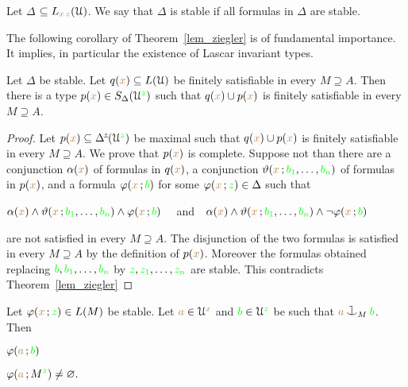 \def\ceq#1#2#3{\parbox[t]{20ex}{$\displaystyle #1$}\medrel{#2}$\displaystyle  #3$}


Let \emph{$\Delta$\/} $\subseteq L_{{\color{brown} x}\,{\color{green} z}}(\EuScript U)$.
We say that $\Delta$ is stable if all formulas in $\Delta$ are stable.

The following corollary of Theorem~\ref{lem_ziegler} is of fundamental importance.
It implies, in particular the existence of Lascar invariant types.

\begin{corollary}\label{corol_stable_coheir_over_models}
  Let  $\Delta$ be stable.
  Let $q({\color{brown} x})\subseteq L(\EuScript U)$ be finitely satisfiable in every $M\supseteq A$.
  Then there is a type $p({\color{brown} x})\in S_\Delta(\EuScript U^{\color{green} z})$ such that $q({\color{brown} x})\cup p({\color{brown} x})$ is finitely satisfiable in every $M\supseteq A$.
\end{corollary}

\begin{proof}
  Let $p({\mr x})\subseteq \pmDelta(\U^{\gr z})$ be maximal such that $q({\color{brown} x})\cup p({\color{brown} x})$ is finitely satisfiable in every $M\supseteq A$.
  We prove that $p({\color{brown} x})$ is complete.
  Suppose not than there are a conjunction $\alpha({\color{brown} x})$ of formulas in $q({\color{brown} x})$, a conjunction $\vartheta({\color{brown} x}\,;{\color{green} b_1},\dots,{\color{green} b_n})$ of formulas in $p({\color{brown} x})$, and a formula $\varphi({\color{brown} x}\,;{\color{green} b})$ for some $\varphi({\color{brown} x}\,;{\color{green} z})\in\Delta$ such that 

  \hfil$\alpha({\color{brown} x})\wedge\vartheta({\color{brown} x}\,;{\color{green} b_1},\dots,{\color{green} b_n})\wedge\varphi({\color{brown} x}\,;{\color{green} b})$ \ \ and\ \   $\alpha({\color{brown} x})\wedge\vartheta({\color{brown} x}\,;{\color{green} b_1},\dots,{\color{green} b_n})\wedge\neg\varphi({\color{brown} x}\,;{\color{green} b})$ 
 
  are not satisfied in every $M\supseteq A$.
  The disjunction of the two formulas is satisfied in every $M\supseteq A$ by the definition of $p({\color{brown} x})$.
  Moreover the formulas obtained replacing ${\color{green} b},{\color{green} b_1},\dots,{\color{green} b_n}$ by ${\color{green} z},{\color{green} z_1},\dots,{\color{green} z_n}$ are stable.
  This contradicts Theorem~\ref{lem_ziegler}
\end{proof}

\begin{theorem}[ (Symmetry)]\label{thm_symmetry}
  Let $\varphi({\color{brown} x}\,;{\color{green} z})\in L(M)$ be stable.
  Let ${\color{brown} a}\in\EuScript U^{\color{brown} x}$ and ${\color{green} b}\in\EuScript U^{\color{green} z}$ be such that ${\mr a}\cnonfork_M{\gr b}$.
  Then\smallskip

  \ceq{\hfill\phi({\mr a}\,;{\gr b})}{\IMP}{\phi({\mr a}\,;M^{\gr z})\neq\varnothing.}
\end{theorem}

